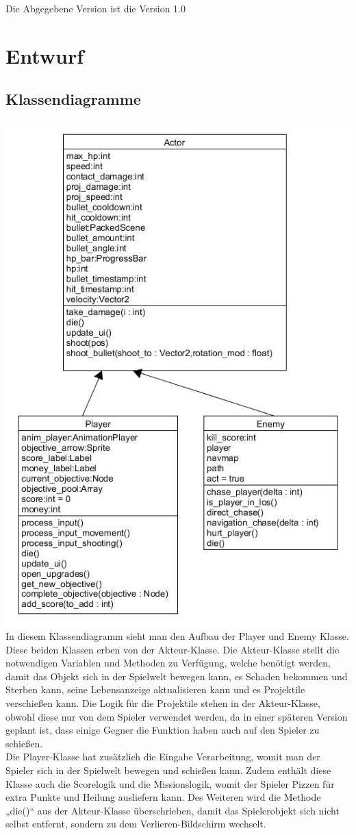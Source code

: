 \documentclass{article}
\begin{document}
	Die Abgegebene Version ist die Version 1.0

	\section{Entwurf}
	\subsection{Klassendiagramme}
	
	\includegraphics[height=\linewidth]{klassendiagramm1.jpg}\\
	In diesem Klassendiagramm sieht man den Aufbau der Player und Enemy Klasse. Diese beiden Klassen erben von der Akteur-Klasse. Die Akteur-Klasse stellt die notwendigen Variablen und Methoden zu Verfügung, welche benötigt werden, damit das Objekt sich in der Spielwelt bewegen kann, es Schaden bekommen und Sterben kann, seine Lebensanzeige aktualisieren kann und es Projektile verschießen kann. Die Logik für die Projektile stehen in der Akteur-Klasse, obwohl diese nur von dem Spieler verwendet werden, da in einer späteren Version geplant ist, dass einige Gegner die Funktion haben auch auf den Spieler zu schießen.\\
	
	
	Die Player-Klasse hat zusätzlich die Eingabe Verarbeitung, womit man der Spieler sich in der Spielwelt bewegen und schießen kann. Zudem enthält diese Klasse auch die Scorelogik und die Missionslogik, womit der Spieler Pizzen für extra Punkte und Heilung ausliefern kann. Des Weiteren wird die Methode „die()“ aus der Akteur-Klasse überschrieben, damit das Spielerobjekt sich nicht selbst entfernt, sondern zu dem Verlieren-Bildschirm wechselt.\\
	
\end{document}
